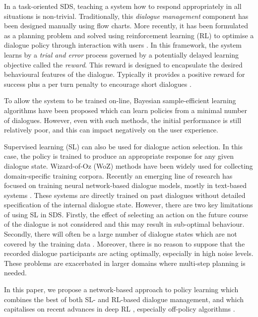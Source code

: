 \documentclass[11pt,a4paper]{article}
\begin{document}
In a task-oriented SDS, teaching a system how to respond appropriately in all situations is non-trivial. 
Traditionally, this {\it dialogue management} component has been designed manually using flow charts.
More recently, it has been formulated as a planning problem and solved using reinforcement learning (RL) to optimise a dialogue policy through interaction with users \cite{levin1997stochastic,roy2000spoken,POMDP_williams,jurvcivcek2011natural}. In this framework, the system learns by a {\it trial and error} process governed by a potentially delayed learning objective called the {\it reward}.  This reward is designed to encapsulate the desired behavioural features of the dialogue. Typically it provides a positive reward for success plus a per turn penalty to encourage short dialogues
\cite{el2014task,Su_2015,vandyke15a,su:2016:acl}.

To allow the system to be trained on-line, Bayesian sample-efficient learning algorithms have been proposed \cite{GPRL,KTD} which can learn policies from a minimal number of dialogues.
However, even with such methods, the initial performance is still relatively poor, and this can impact negatively on the user experience.

Supervised learning (SL) can also be used for dialogue action selection.  In this case, 
the policy is trained to produce an appropriate response for any given dialogue state. Wizard-of-Oz (WoZ) methods \cite{Kelley84,dahlback1993wizard} have been widely used for collecting domain-specific training corpora.
Recently an emerging line of research has focused on training neural network-based dialogue models, mostly in text-based systems \cite{vinyals2015neural,shang2015neural,serban2015hierarchical,wenN2N16,fb_n2n}.
These systems are directly trained on past dialogues without detailed specification of the internal dialogue state.
However, there are two key limitations of using SL in SDS. Firstly, the effect of selecting an action on the future course of the dialogue is not considered and this may result in sub-optimal behaviour. Secondly, there will often be a large number of dialogue states  which are not covered by the training data \cite{henderson2008hybrid,li2014temporal}. Moreover, there is no reason to suppose that the recorded dialogue participants are acting optimally, especially in high noise levels.
These problems are exacerbated in larger domains where multi-step planning is needed. 

In this paper, we propose a network-based approach to policy learning which combines the best of both SL- and RL-based dialogue management, and which capitalises on recent advances in deep RL \cite{mnih2015human}, especially off-policy algorithms
\cite{wang2016sample}.
\end{document}

